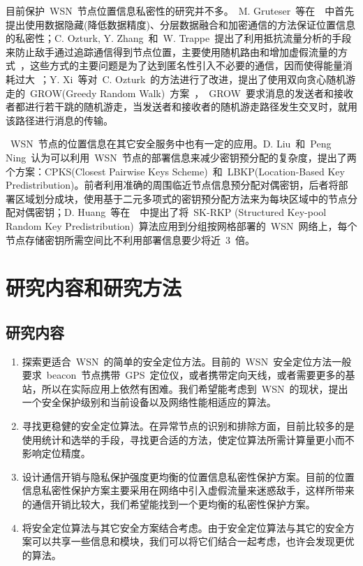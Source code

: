 \documentclass[a4paper,10pt]{article}
\begin{document}
目前保护~WSN~节点位置信息私密性的研究并不多。~M. Gruteser~等在~\cite{Gruteser2003}~中首先提出使用数据隐藏(降低数据精度)、分层数据融合和加密通信的方法保证位置信息的私密性；C. Ozturk, Y. Zhang~和~W. Trappe~提出了利用抵抗流量分析的手段来防止敌手通过追踪通信得到节点位置，主要使用随机路由和增加虚假流量的方式~\cite{Ozturk2004}，这些方式的主要问题是为了达到匿名性引入不必要的通信，因而使得能量消耗过大~\cite{Xiao2006}；Y. Xi~等对~C. Ozturk~的方法进行了改进，提出了使用双向贪心随机游走的~GROW(Greedy Random Walk)~方案~\cite{Xi2006}，~GROW~要求消息的发送者和接收者都进行若干跳的随机游走，当发送者和接收者的随机游走路径发生交叉时，就用该路径进行消息的传输。

~WSN~节点的位置信息在其它安全服务中也有一定的应用。D. Liu~和~Peng Ning~认为可以利用~WSN~节点的部署信息来减少密钥预分配的复杂度，提出了两个方案：CPKS(Closest Pairwise Keys Scheme)~和~LBKP(Location-Based Key Predistribution)\cite{Liu2003}。前者利用准确的周围临近节点信息预分配对偶密钥，后者将部署区域划分成块，使用基于二元多项式的密钥预分配方法来为每块区域中的节点分配对偶密钥；D. Huang~等在~\cite{Huang2004}~中提出了将~SK-RKP (Structured Key-pool Random Key Predistribution)~算法应用到分组按网格部署的~WSN~网络上，每个节点存储密钥所需空间比不利用部署信息要少将近~3~倍。

\section{研究内容和研究方法} 

\subsection{研究内容}

\begin{enumerate}

\item 探索更适合~WSN~的简单的安全定位方法。目前的~WSN~安全定位方法一般要求~beacon~节点携带~GPS~定位仪，或者携带定向天线，或者需要更多的基站，所以在实际应用上依然有困难。我们希望能考虑到~WSN~的现状，提出一个安全保护级别和当前设备以及网络性能相适应的算法。

\item 寻找更稳健的安全定位算法。在异常节点的识别和排除方面，目前比较多的是使用统计和选举的手段，寻找更合适的方法，使定位算法所需计算量更小而不影响定位精度。

\item 设计通信开销与隐私保护强度更均衡的位置信息私密性保护方案。目前的位置信息私密性保护方案主要采用在网络中引入虚假流量来迷惑敌手，这样所带来的通信开销比较大，我们希望能找到一个更均衡的私密性保护方案。

\item 将安全定位算法与其它安全方案结合考虑。由于安全定位算法与其它的安全方案可以共享一些信息和模块，我们可以将它们结合一起考虑，也许会发现更优的算法。

\end{enumerate}
\end{document}
